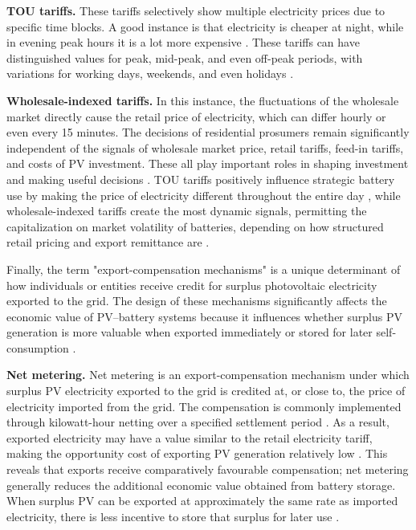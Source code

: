\textbf{TOU tariffs.} These tariffs selectively show multiple
electricity prices due to specific time blocks. A good instance is that
electricity is cheaper at night, while in evening peak hours it is a lot
more expensive \cite{ch2ref054}. These tariffs can have distinguished
values for peak, mid-peak, and even off-peak periods, with variations
for working days, weekends, and even holidays \cite{ch2ref054}.

\textbf{Wholesale-indexed tariffs.} In this instance, the fluctuations
of the wholesale market directly cause the retail price of electricity,
which can differ hourly or even every 15 minutes. The decisions of
residential prosumers remain significantly independent of the signals of
wholesale market price, retail tariffs, feed-in tariffs, and costs of PV
investment. These all play important roles in shaping investment and
making useful decisions \cite{ch2ref055}. TOU tariffs positively influence
strategic battery use by making the price of electricity different
throughout the entire day \cite{ch2ref054}, while wholesale-indexed tariffs
create the most dynamic signals, permitting the capitalization on market
volatility of batteries, depending on how structured retail pricing and
export remittance are \cite{ch2ref055}.

Finally, the term "export-compensation mechanisms" is a unique determinant of how individuals or entities
receive credit for surplus photovoltaic electricity exported to the
grid. The design of these mechanisms significantly affects the economic
value of PV--battery systems because it influences whether surplus PV
generation is more valuable when exported immediately or stored for
later self-consumption \cite{ch2ref056}.

\textbf{Net metering.} Net metering is an export-compensation mechanism
under which surplus PV electricity exported to the grid is credited at,
or close to, the price of electricity imported from the grid. The
compensation is commonly implemented through kilowatt-hour netting over
a specified settlement period \cite{ch2ref057,ch2ref056}. As a result,
exported electricity may have a value similar to the retail electricity
tariff, making the opportunity cost of exporting PV generation
relatively low \cite{ch2ref057}. This reveals that exports receive comparatively favourable compensation; net
metering generally reduces the additional economic value obtained from
battery storage. When surplus PV can be exported at approximately the
same rate as imported electricity, there is less incentive to store that
surplus for later use \cite{ch2ref056}.

